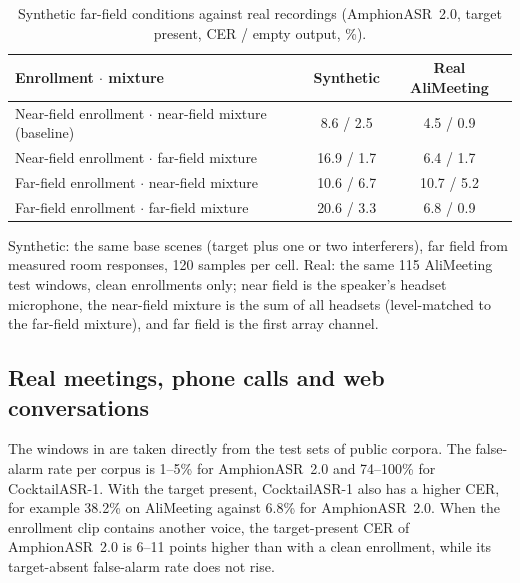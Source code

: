\begin{table}[t]
  \caption{Synthetic far-field conditions against real recordings (AmphionASR~2.0, target present, CER / empty output, \%).}
  \label{tab:nearfar}
  \centering
  \small
  \begin{tabular}{@{}lcc@{}}
    \toprule
    Enrollment $\cdot$ mixture & Synthetic & Real AliMeeting \\
    \midrule
    Near-field enrollment $\cdot$ near-field mixture (baseline) & 8.6 / 2.5 & 4.5 / 0.9 \\
    Near-field enrollment $\cdot$ far-field mixture & 16.9 / 1.7 & 6.4 / 1.7 \\
    Far-field enrollment $\cdot$ near-field mixture & 10.6 / 6.7 & 10.7 / 5.2 \\
    Far-field enrollment $\cdot$ far-field mixture & 20.6 / 3.3 & 6.8 / 0.9 \\
    \bottomrule
  \end{tabular}
  \par\smallskip
  {\footnotesize Synthetic: the same base scenes (target plus one or two interferers), far field from measured room responses, 120 samples per cell. Real: the same 115 AliMeeting test windows, clean enrollments only; near field is the speaker's headset microphone, the near-field mixture is the sum of all headsets (level-matched to the far-field mixture), and far field is the first array channel.\par}
\end{table}

\subsection{Real meetings, phone calls and web conversations}
\label{subsec:exp_real}

The windows in  are taken directly from the test sets of public corpora.
The false-alarm rate per corpus is 1--5\% for AmphionASR~2.0 and 74--100\% for CocktailASR-1.
With the target present, CocktailASR-1 also has a higher CER, for example 38.2\% on AliMeeting against 6.8\% for AmphionASR~2.0.
When the enrollment clip contains another voice, the target-present CER of AmphionASR~2.0 is 6--11 points higher than with a clean enrollment, while its target-absent false-alarm rate does not rise.

